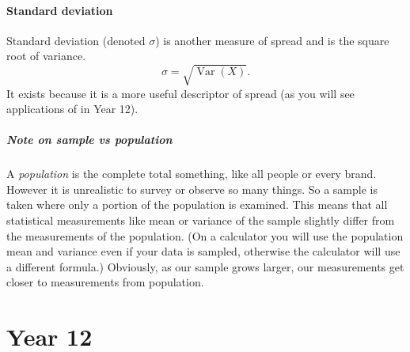 \documentclass[12pt]{book}
\DeclareMathOperator{\var}{Var}
\theoremstyle{definition}
\begin{document}
\subsection{Standard deviation}
  Standard deviation (denoted $\sigma$) is another measure of spread and is the square root of variance.
  \[\sigma=\sqrt{\var(X)}.\]
  It exists because it is a more useful descriptor of spread (as you will see applications of in Year 12).
\subsubsection*{Note on sample vs population}
  A \textit{population} is the complete total something, like all people or every brand. However it is unrealistic to survey or observe so many
  things. So a sample is taken where only a portion of the population is examined. This means that all statistical measurements like
  mean or variance of the sample slightly differ from the measurements of the population. (On a calculator you will use the population
  mean and variance even if your data is sampled, otherwise the calculator will use a different formula.) Obviously, as our sample
  grows larger, our measurements get closer to measurements from population.
\part{Year 12}
\end{document}
